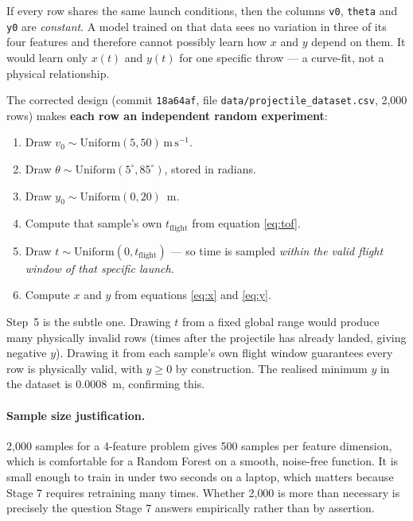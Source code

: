 \documentclass[11pt,a4paper]{article}
\newcommand{\vzero}{v_{0}}
\newcommand{\yzero}{y_{0}}
\newcommand{\ms}{\,\mathrm{m\,s^{-1}}}
\begin{document}
If every row shares the same launch conditions, then the columns \texttt{v0}, \texttt{theta} and
\texttt{y0} are \emph{constant}. A model trained on that data sees no variation in three of its
four features and therefore cannot possibly learn how $x$ and $y$ depend on them. It would learn
only $x(t)$ and $y(t)$ for one specific throw --- a curve-fit, not a physical relationship.

The corrected design (commit \texttt{18a64af}, file \texttt{data/projectile\_dataset.csv},
2{,}000 rows) makes \textbf{each row an independent random experiment}:

\begin{enumerate}[leftmargin=2em,itemsep=0.1em]
  \item Draw $\vzero\sim\mathrm{Uniform}(5,50)\ms$.
  \item Draw $\theta\sim\mathrm{Uniform}(5^\circ,85^\circ)$, stored in radians.
  \item Draw $\yzero\sim\mathrm{Uniform}(0,20)$~m.
  \item Compute that sample's own $t_{\text{flight}}$ from equation \eqref{eq:tof}.
  \item Draw $t\sim\mathrm{Uniform}(0,t_{\text{flight}})$ --- so time is sampled \emph{within the
        valid flight window of that specific launch}.
  \item Compute $x$ and $y$ from equations \eqref{eq:x} and \eqref{eq:y}.
\end{enumerate}

Step~5 is the subtle one. Drawing $t$ from a fixed global range would produce many physically
invalid rows (times after the projectile has already landed, giving negative $y$). Drawing it from
each sample's own flight window guarantees every row is physically valid, with $y\geq0$ by
construction. The realised minimum $y$ in the dataset is $0.0008$~m, confirming this.

\paragraph{Sample size justification.}
2{,}000 samples for a 4-feature problem gives 500 samples per feature dimension, which is
comfortable for a Random Forest on a smooth, noise-free function. It is small enough to train in
under two seconds on a laptop, which matters because Stage 7 requires retraining many times.
Whether 2{,}000 is more than necessary is precisely the question Stage 7 answers empirically rather
than by assertion.
\end{document}
